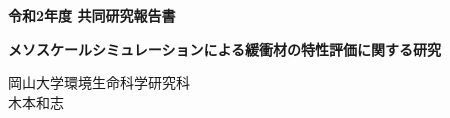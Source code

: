 ﻿\documentclass[11pt,a4j]{jarticle}
\newlength{\minitwocolumn}
\begin{document}
\newcommand{\fat}[1]{\mbox{\boldmath $#1$}}
\newcommand{\D}{\partial}
\newcommand{\w}{\omega}
\newcommand{\ga}{\alpha}
\newcommand{\gb}{\beta}
\newcommand{\gx}{\xi}
\newcommand{\gz}{\zeta}
\newcommand{\vhat}[1]{\hat{\fat{#1}}}
\newcommand{\spc}{\vspace{0.7\baselineskip}}
\newcommand{\halfspc}{\vspace{0.3\baselineskip}}

\newcommand{\twofig}[2]
 {
   \begin{figure}[h]
     \begin{minipage}[t]{\minitwocolumn}
         \begin{center}   #1
         \end{center}
     \end{minipage}
         \hspace{\columnsep}
     \begin{minipage}[t]{\minitwocolumn}
         \begin{center} #2
         \end{center}
     \end{minipage}
   \end{figure}
 }
\begin{center}
{\Large \bf 令和2年度 共同研究報告書}
\end{center}
\vspace{2mm}
\begin{center}
{\LARGE \bf 
メソスケールシミュレーションによる緩衝材の特性評価に関する研究} 
\end{center}
\begin{center}
岡山大学環境生命科学研究科\\
木本和志
\end{center}
\vspace{10mm}




\end{document}
